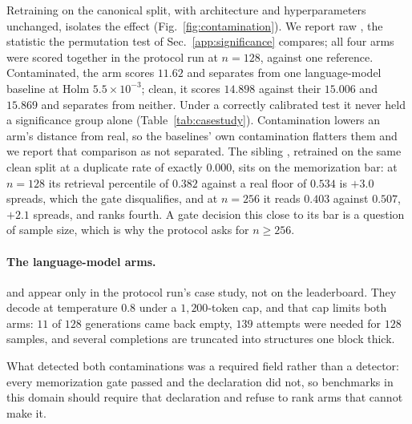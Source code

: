 Retraining \voxar{} on the canonical split, with architecture and hyperparameters
unchanged, isolates the effect (Fig.~\ref{fig:contamination}). We report raw \vkid{},
the statistic the permutation test of Sec.~\ref{app:significance} compares; all four
arms were scored together in the protocol run at $n{=}128$, against one reference. Contaminated, the arm
scores $11.62$ and separates from one language-model baseline at Holm
$5.5{\times}10^{-3}$; clean, it scores $14.898$ against their $15.006$ and $15.869$ and
separates from neither. Under a correctly calibrated test it never held a significance group
alone (Table~\ref{tab:casestudy}). Contamination lowers an arm's distance from real,
so the baselines' own contamination flatters them and we report that comparison as not
separated. The sibling \voxarun{}, retrained on the same clean split at a duplicate rate of
exactly $0.000$, sits on the memorization bar: at $n{=}128$ its retrieval percentile of
$0.382$ against a real floor of $0.534$ is $+3.0$ spreads, which the gate disqualifies, and at
$n{=}256$ it reads $0.403$ against $0.507$, $+2.1$ spreads, and ranks fourth. A gate decision
this close to its bar is a question of sample size, which is why the protocol asks for
$n \geq 256$.

\paragraph{The language-model arms.} \llmft{} and \llmgeo{} appear only in the
protocol run's case study, not on the leaderboard. They decode at temperature
$0.8$ under a $1{,}200$-token cap, and that cap limits both arms: $11$ of $128$
generations came back empty, $139$ attempts were needed for $128$ samples, and
several completions are truncated into structures one block thick.

What detected both contaminations was a required field rather than a detector: every
memorization gate passed and the declaration did not, so benchmarks in this domain should
require that declaration and refuse to rank arms that cannot make it.


